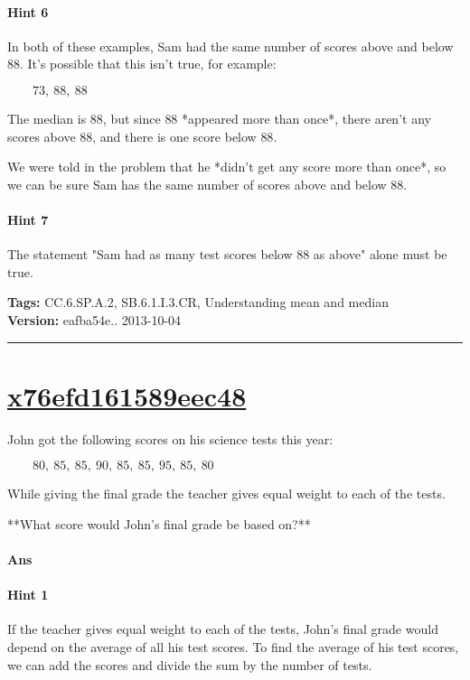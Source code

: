 \documentclass[twocolumn,10pt]{article}
\begin{document}
\paragraph{Hint 6}In both of these examples, Sam had the same number of scores above and below $88$. It's possible that this isn't true, for example:

$\qquad 73,~88, ~88$

The median is $88$, but since $88$ *appeared more than once*, there aren't any scores above $88$, and there is one score below $88$.

We were told in the problem that he *didn't get any score more than once*, so we can be sure Sam has the same number of scores above and below $88$.

\paragraph{Hint 7}The statement "Sam had as many test scores below $88$ as above" alone must be true.



\medskip
\noindent
\textbf{Tags:} {\footnotesize CC.6.SP.A.2, SB.6.1.I.3.CR, Understanding mean and median}\\
\textbf{Version:} eafba54e.. 2013-10-04
\smallskip\hrule





\section{\href{https://www.khanacademy.org/devadmin/content/items/x76efd161589eec48}{x76efd161589eec48}}

\noindent
John got the following scores on his science tests this year:  

$\qquad80,~85,~85,~90,~85,~85,~95,~85,~80$

While giving the final grade the teacher gives equal weight to each of the tests.

**What score would John's final grade be based on?**

\paragraph{Ans} 

\paragraph{Hint 1}If the teacher gives equal weight to each of the tests, John's final grade would depend on the average of all his test scores.  To find the average of his test scores, we can add the scores and divide the sum by the number of tests.
\end{document}
